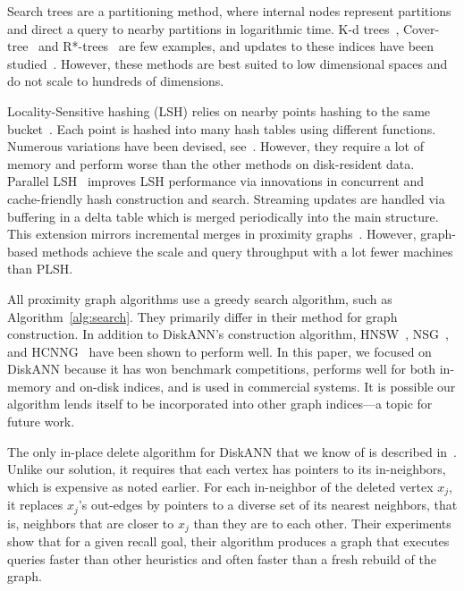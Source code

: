 Search trees are a partitioning method, where internal nodes
represent partitions and direct a query to nearby
partitions in logarithmic time.
K-d trees~, Cover-tree~\cite{Beygelzimer06} and R*-trees~\cite{Beckmann90} 
are few examples, and updates to these indices have been  studied~\cite{dobson2021parallelnearestneighborslow}.
However, these methods are best suited to low dimensional spaces
and do not scale to hundreds of dimensions.

Locality-Sensitive hashing (LSH) relies on nearby points hashing to the same bucket~\cite{Indyk98}.
Each point is hashed into many hash tables using different functions.
Numerous variations have been devised, see~\cite{LSHSurvey08}.
However, they require a lot of memory and perform worse than the other methods on disk-resident data.
Parallel LSH~\cite{PLSH13} improves LSH performance via innovations in
concurrent and cache-friendly hash construction and search. 
Streaming updates are handled via buffering in a delta table
which is merged periodically into the main structure.
This extension mirrors incremental merges in proximity graphs~\cite{freshdiskann}.
However, graph-based methods achieve the scale and query throughput with a lot fewer machines than PLSH.



All proximity graph algorithms use a greedy search algorithm, such as Algorithm~\ref{alg:search}.
They primarily differ in their method for graph construction.
In addition to DiskANN's construction algorithm, HNSW~\cite{HNSW16}, NSG~\cite{NSG17}, and HCNNG~\cite{MunozGDT19} have been shown to perform well. 
In this paper, we focused on DiskANN because it has won benchmark competitions,
performs well for both in-memory and on-disk indices, and is used in commercial systems.
It is possible our algorithm lends itself to be incorporated into other graph indices---a topic for future work.

The only in-place delete algorithm for DiskANN that we know of is described in~\cite{ZhaozhuXuEtAl22}.
Unlike our solution, it requires that each vertex has pointers to its in-neighbors, which is expensive as noted earlier.
For each in-neighbor of the deleted vertex $x_j$, it replaces $x_j$'s out-edges by pointers to a diverse set of its nearest neighbors, that is, neighbors that are closer to $x_j$ than they are to each other.
Their experiments show that for a given recall goal, their algorithm produces a graph that executes queries faster than other heuristics and often faster than a fresh rebuild of the graph.

